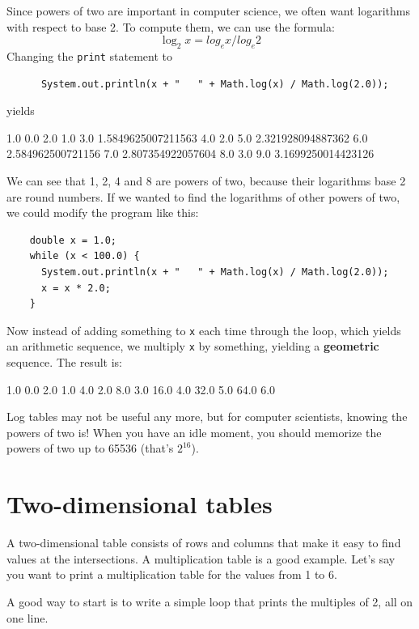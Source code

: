 Since powers of two are important
in computer science, we often want logarithms with
respect to base 2.  To compute them, we can use the formula:
%
\begin{equation*}
\log_2 x = log_e x / log_e 2
\end{equation*}
%
Changing the {\tt print} statement to

\begin{lstlisting}
      System.out.println(x + "   " + Math.log(x) / Math.log(2.0));
\end{lstlisting}
%
yields

\begin{stdout}
1.0   0.0
2.0   1.0
3.0   1.5849625007211563
4.0   2.0
5.0   2.321928094887362
6.0   2.584962500721156
7.0   2.807354922057604
8.0   3.0
9.0   3.1699250014423126
\end{stdout}
%
We can see that 1, 2, 4 and 8 are powers of two, because
their logarithms base 2 are round numbers.  If we wanted to find
the logarithms of other powers of two, we could modify the
program like this:

\begin{lstlisting}
    double x = 1.0;
    while (x < 100.0) {
      System.out.println(x + "   " + Math.log(x) / Math.log(2.0));
      x = x * 2.0;
    }
\end{lstlisting}
%
Now instead of adding something to {\tt x} each time through
the loop, which yields an arithmetic sequence, we multiply
{\tt x} by something, yielding a {\bf geometric} sequence.
The result is:

\begin{stdout}
1.0   0.0
2.0   1.0
4.0   2.0
8.0   3.0
16.0   4.0
32.0   5.0
64.0   6.0
\end{stdout}
%
Log tables may not be useful any more, but for computer scientists,
knowing the powers of two is!  When you have an idle
moment, you should memorize the powers of two up to 65536
(that's $2^{16}$).


\section{Two-dimensional tables}

A two-dimensional table consists of rows and columns that make
it easy to find values at the intersections.  A multiplication
table is a good example.  Let's say you want to print a
multiplication table for the values from 1 to 6.

A good way to start is to write a simple loop that prints
the multiples of 2, all on one line.

